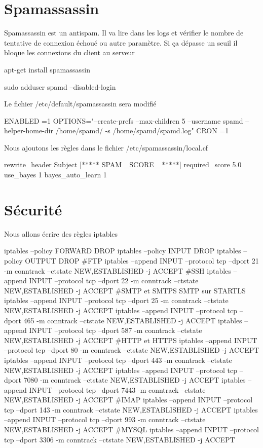 \documentclass[a4paper,12pt,french]{report} %
\begin{document}
\section{Spamassassin}
Spamassassin est un antispam. Il va lire dans les logs et vérifier le nombre de tentative de connexion échoué ou autre paramètre. Si ça dépasse un seuil il bloque les connexions du client au serveur
\begin{exempleConsole}
apt-get install spamassassin
\end{exempleConsole}
\begin{exempleConsole}
sudo adduser spamd --disabled-login
\end{exempleConsole}
Le fichier /etc/default/spamassassin sera modifié
\begin{exempleConsole}
ENABLED =1
OPTIONS="--create-prefs --max-children 5 --username spamd --helper-home-dir /home/spamd/ -s /home/spamd/spamd.log"
CRON =1
\end{exempleConsole}
Nous ajoutons les règles dans le fichier /etc/spamassassin/local.cf
\begin{exempleConsole}
rewrite_header Subject [***** SPAM _SCORE_ *****]
required_score 5.0
use_bayes 1
bayes_auto_learn 1
\end{exempleConsole}
\section{ Sécurité}
Nous allons écrire des règles iptables 
\begin{exempleConsole}
iptables --policy FORWARD DROP
iptables --policy INPUT  DROP
iptables --policy OUTPUT  DROP
#FTP
iptables --append INPUT --protocol tcp --dport 21 -m conntrack --ctstate NEW,ESTABLISHED -j ACCEPT
#SSH
iptables --append INPUT --protocol tcp --dport 22 -m conntrack --ctstate NEW,ESTABLISHED -j ACCEPT
#SMTP et SMTPS SMTP sur STARTLS
iptables --append INPUT --protocol tcp --dport 25 -m conntrack --ctstate NEW,ESTABLISHED -j ACCEPT
iptables --append INPUT --protocol tcp --dport 465 -m conntrack --ctstate NEW,ESTABLISHED -j ACCEPT
iptables --append INPUT --protocol tcp --dport 587 -m conntrack --ctstate NEW,ESTABLISHED -j ACCEPT
#HTTP et HTTPS
iptables --append INPUT --protocol tcp --dport 80 -m conntrack --ctstate NEW,ESTABLISHED -j ACCEPT
iptables --append INPUT --protocol tcp --dport 443 -m conntrack --ctstate NEW,ESTABLISHED -j ACCEPT
iptables --append INPUT --protocol tcp --dport 7080 -m conntrack --ctstate NEW,ESTABLISHED -j ACCEPT
iptables --append INPUT --protocol tcp --dport 7443 -m conntrack --ctstate NEW,ESTABLISHED -j ACCEPT
#IMAP
iptables --append INPUT --protocol tcp --dport 143 -m conntrack --ctstate NEW,ESTABLISHED -j ACCEPT
iptables --append INPUT --protocol tcp --dport 993 -m conntrack --ctstate NEW,ESTABLISHED -j ACCEPT
#MYSQL
iptables --append INPUT --protocol tcp --dport 3306 -m conntrack --ctstate NEW,ESTABLISHED -j ACCEPT

\end{exempleConsole}
\end{document}
